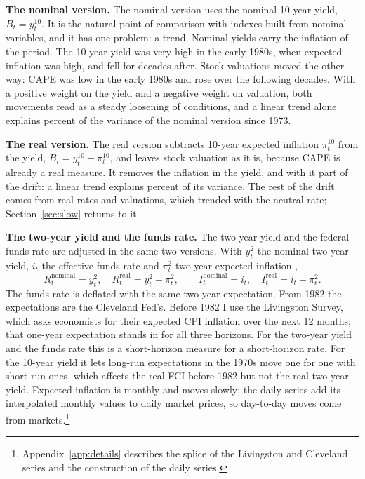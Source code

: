 \documentclass[11pt]{article}
\begin{document}
\textbf{The nominal version.} The nominal version uses the nominal 10-year yield, $B_t=y^{10}_t$. It is the natural point of comparison with indexes built from nominal variables, and it has one problem: a trend. Nominal yields carry the inflation of the period. The 10-year yield was very high in the early 1980s, when expected inflation was high, and fell for decades after. Stock valuations moved the other way: CAPE was low in the early 1980s and rose over the following decades. With a positive weight on the yield and a negative weight on valuation, both movements read as a steady loosening of conditions, and a linear trend alone explains  percent of the variance of the nominal version since 1973.

\textbf{The real version.} The real version subtracts 10-year expected inflation $\pi^{10}_t$ from the yield, $B_t=y^{10}_t-\pi^{10}_t$, and leaves stock valuation as it is, because CAPE is already a real measure. It removes the inflation in the yield, and with it part of the drift: a linear trend explains  percent of its variance. The rest of the drift comes from real rates and valuations, which trended with the neutral rate; Section~\ref{sec:slow} returns to it.

\textbf{The two-year yield and the funds rate.} The two-year yield and the federal funds rate are adjusted in the same two versions. With $y^{2}_t$ the nominal two-year yield, $i_t$ the effective funds rate and $\pi^{2}_t$ two-year expected inflation \citep[from the Cleveland Fed;][]{haubrich2012},
\begin{equation}
R_t^{\text{nominal}} = y^{2}_t, \quad R_t^{\text{real}} = y^{2}_t - \pi^{2}_t, \qquad I_t^{\text{nominal}} = i_t, \quad I_t^{\text{real}} = i_t - \pi^{2}_t. \label{eq:twoyear}
\end{equation}
The funds rate is deflated with the same two-year expectation. From 1982 the expectations are the Cleveland Fed's. Before 1982 I use the Livingston Survey, which asks economists for their expected CPI inflation over the next 12 months; that one-year expectation stands in for all three horizons. For the two-year yield and the funds rate this is a short-horizon measure for a short-horizon rate. For the 10-year yield it lets long-run expectations in the 1970s move one for one with short-run ones, which affects the real FCI before 1982 but not the real two-year yield. Expected inflation is monthly and moves slowly; the daily series add its interpolated monthly values to daily market prices, so day-to-day moves come from markets.\footnote{Appendix~\ref{app:details} describes the splice of the Livingston and Cleveland series and the construction of the daily series.}
\end{document}
